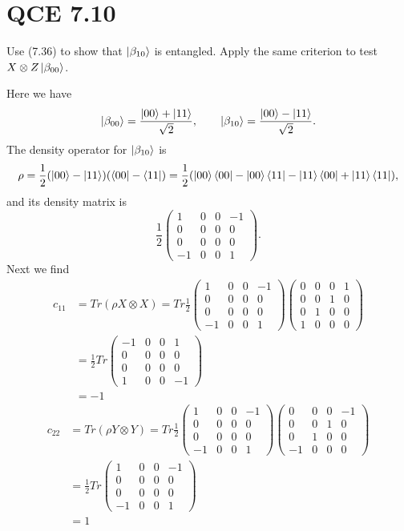 \documentclass[10pt]{article}
\begin{document}
\section*{QCE 7.10}
Use (7.36) to show that $\ket{\beta_{10}}$ is entangled. Apply the same criterion to test $X \otimes Z\ket{\beta_{00}}$.

Here we have
\[
\ket{\beta_{00}} = \frac{\ket{00} + \ket{11}}{\sqrt{2}}, \qquad
\ket{\beta_{10}} = \frac{\ket{00} - \ket{11}}{\sqrt{2}}.
\]
The density operator for $\ket{\beta_{10}}$ is
\[
\rho = \frac{1}{2}(\ket{00} - \ket{11})(\bra{00} - \bra{11}) = \frac{1}{2} (\ket{00} \bra{00} - \ket{00} \bra{11} - \ket{11} \bra{00} + \ket{11} \bra{11}),
\]
and its density matrix is
\[
\frac{1}{2} \begin{pmatrix}
1  & 0  & 0 & -1 \\
0  & 0  & 0 & 0 \\
0  & 0  & 0 & 0 \\
-1 & 0 & 0 & 1
\end{pmatrix}.
\]
Next we find
\begin{align*}
c_{11} &= Tr(\rho X \otimes X) = Tr \frac{1}{2} 
\begin{pmatrix}
1 & 0 & 0 & -1 \\
0 & 0 & 0 & 0 \\
0 & 0 & 0 & 0 \\
-1 & 0 & 0 & 1 
\end{pmatrix}
\begin{pmatrix}
0 & 0 & 0 & 1 \\
0 & 0 & 1 & 0 \\
0 & 1 & 0 & 0 \\
1 & 0 & 0 & 0 
\end{pmatrix} \\
&=
\frac{1}{2} Tr
\begin{pmatrix}
-1 & 0 & 0 & 1 \\
0 & 0 & 0 & 0 \\
0 & 0 & 0 & 0 \\
1 & 0 & 0 & -1 
\end{pmatrix} \\
&= -1
\end{align*}
\begin{align*}
c_{22} &= Tr(\rho Y \otimes Y) = Tr \frac{1}{2} 
\begin{pmatrix}
1 & 0 & 0 & -1 \\
0 & 0 & 0 & 0 \\
0 & 0 & 0 & 0 \\
-1 & 0 & 0 & 1 
\end{pmatrix}
\begin{pmatrix}
0 & 0 & 0 & -1 \\
0 & 0 & 1 & 0 \\
0 & 1 & 0 & 0 \\
-1 & 0 & 0 & 0 
\end{pmatrix} \\
&=
\frac{1}{2} Tr
\begin{pmatrix}
1 & 0 & 0 & -1 \\
0 & 0 & 0 & 0 \\
0 & 0 & 0 & 0 \\
-1 & 0 & 0 & 1 
\end{pmatrix} \\
&= 1
\end{align*}
\end{document}

